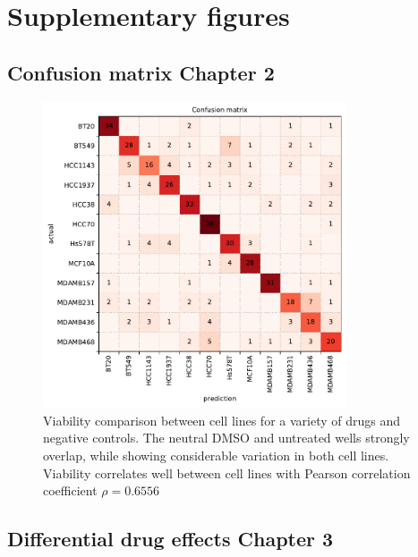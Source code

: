 
\chapter{Supplementary figures} %
\label{AppendixE} %


\section{Confusion matrix Chapter 2}

\begin{figure}[h!]
\centering
\includegraphics[width=0.8\textwidth]{img/confusion_matrix.pdf}
\caption{Viability comparison between cell lines for a variety of drugs and negative controls. The neutral DMSO and untreated wells strongly overlap, while showing considerable variation in both cell lines. Viability correlates well between cell lines with Pearson correlation coefficient $\rho = 0.6556$}
\label{fig:viability}
\end{figure}

\section{Differential drug effects Chapter 3}

